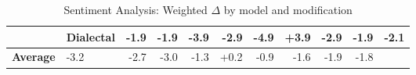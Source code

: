 \begin{table}[h]
{\begin{tabular}{llrrrrrrrrr}
  & \textbf{Dialectal} & \cellcolor{red!3} -1.9 & \cellcolor{red!3} -1.9 & \cellcolor{red!7} -3.9 & \cellcolor{red!5} -2.9 & \cellcolor{red!9} \textbf{-4.9} & \cellcolor{green!7} +3.9 & \cellcolor{red!5} \textbf{-2.9} & \cellcolor{red!3} -1.9 & -2.1 \\
\midrule
\textbf{Average} &  -3.2 & -2.7 & -3.0 & -1.3 & +0.2 & -0.9 & -1.6 & -1.9 & -1.8 \\
\bottomrule
\end{tabular}}
\caption{Sentiment Analysis: Weighted $\Delta$ by model and modification}\label{tab:sa_delta}
\end{table}
